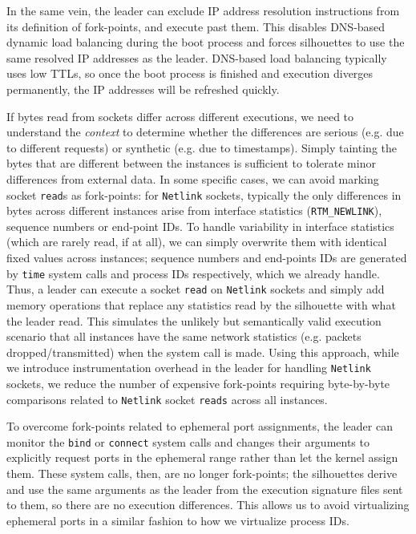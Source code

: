 In the same vein, the leader can exclude 
IP address resolution instructions from its definition
of fork-points, and execute past them. This disables DNS-based 
dynamic load balancing during the boot process and forces silhouettes
to use the same resolved IP addresses as the leader.
DNS-based load balancing typically uses low TTLs, so once 
the boot process is finished and execution diverges
permanently, the IP addresses will be refreshed 
quickly.

If bytes read from sockets differ across different executions,
we need to understand the {\em context} to determine whether the
differences are serious (e.g. due to different requests)
or synthetic (e.g. due to timestamps). Simply tainting 
the bytes that are different between
the instances is sufficient to tolerate
minor differences from external data.
In some specific cases, we can avoid marking
socket \texttt{read}s as fork-points:
for \texttt{Netlink} sockets, typically the only differences
in bytes across different instances
arise from interface statistics (\texttt{RTM\_NEWLINK}), 
sequence numbers or end-point IDs.
To handle variability in interface statistics (which are rarely read, if at all),
we can simply overwrite them with identical fixed values
across instances; sequence numbers
and end-points IDs are generated by 
\texttt{time} system calls and process IDs
respectively, which we already handle.
Thus, a leader can execute a socket 
\texttt{read} on \texttt{Netlink} sockets
and simply add memory operations that 
replace any statistics read by the silhouette
with what the leader read. 
This simulates the unlikely but semantically valid execution
scenario that all instances have the same network 
statistics (e.g. packets dropped/transmitted) when the 
system call is made.
Using this approach, while we introduce instrumentation overhead
in the leader for handling \texttt{Netlink} sockets, we reduce the number of expensive
fork-points requiring byte-by-byte comparisons related to \texttt{Netlink} socket \texttt{reads}
across all instances.

To overcome fork-points related to ephemeral port assignments, 
the leader can monitor the \texttt{bind} or \texttt{connect} 
system calls and changes their arguments to explicitly request ports
in the ephemeral range rather than let the kernel 
assign them. These system calls, then,
are no longer fork-points; the silhouettes
derive and use the same arguments as the leader from
the execution signature files sent to them,
so there are no execution differences.
This allows us to avoid virtualizing ephemeral ports
in a similar fashion to how we virtualize process IDs. \newline

